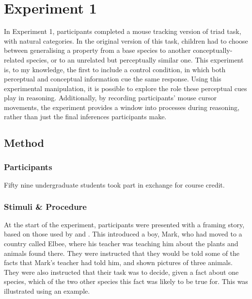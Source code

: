


\section{Experiment 1}

In Experiment 1, participants completed
a mouse tracking version of  triad task,
with natural categories.
In the original version of this task, children had to choose
between generalising a property from a base species
to another conceptually-related species,
or to an unrelated but perceptually similar one.
This experiment is, to my knowledge,
the first to include a control condition,
in which both perceptual and conceptual information cue the same response.
Using this experimental manipulation, it is possible to
explore the role these perceptual cues play in reasoning.
Additionally, by recording participants' mouse cursor movements,
the experiment provides a window into processes during reasoning,
rather than just the final inferences participants make.



\subsection{Method}

\subsubsection{Participants}

Fifty nine undergraduate students took part in exchange for course credit.

\subsubsection{Stimuli \& Procedure}

At  the start of the experiment,
participants were presented with a framing story,
based on those used by \citet{Sloutsky2007} and \citet{Gelman2013c}.
This introduced a boy, Mark, who had moved to a country called Elbee,
where his teacher was teaching him
about the plants and animals found there.
They were instructed that they would be told
some of the facts that Mark's teacher had told him,
and shown pictures of three animals.
They were also instructed that their task was to decide,
given a fact about one species,
which of the two other species
this fact was likely to be true for.
This was illustrated using an example.


